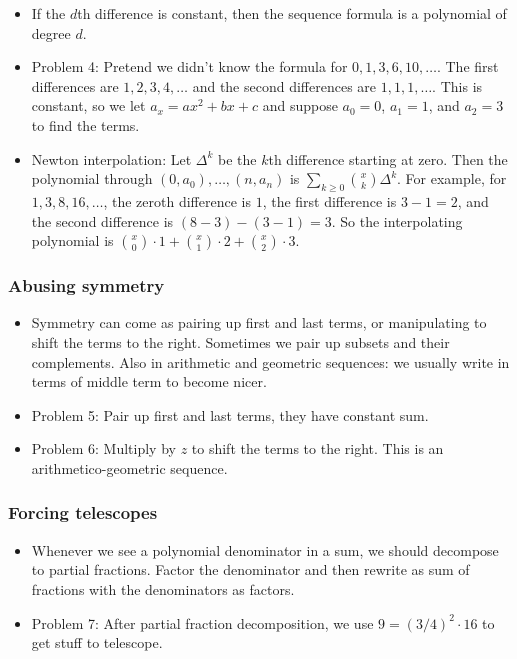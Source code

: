 \documentclass[10pt,paper=letter]{scrartcl}
\begin{document}
\begin{itemize}
  \item If the $d$th difference is constant, then the sequence formula is a polynomial of degree $d$.
  \item Problem 4: Pretend we didn't know the formula for $0, 1, 3, 6, 10, \ldots$. The first differences are $1, 2, 3, 4, \ldots$ and the second differences are $1, 1, 1, \ldots$. This is constant, so we let $a_x = ax^2 + bx + c$ and suppose $a_0 = 0$, $a_1 = 1$, and $a_2 = 3$ to find the terms.
  \item Newton interpolation: Let $\Delta^k$ be the $k$th difference starting at zero. Then the polynomial through $(0, a_0), \ldots, (n, a_n)$ is $\sum_{k \geq 0} \binom{x}{k}\Delta^k$. For example, for $1, 3, 8, 16, \ldots$, the zeroth difference is $1$, the first difference is $3 - 1 = 2$, and the second difference is $(8 - 3) - (3 - 1) = 3$. So the interpolating polynomial is $\binom{x}{0}\cdot 1 + \binom{x}{1} \cdot 2 + \binom{x}{2} \cdot 3$.
\end{itemize}

\subsubsection*{Abusing symmetry}

\begin{itemize}
  \item Symmetry can come as pairing up first and last terms, or manipulating to shift the terms to the right. Sometimes we pair up subsets and their complements. Also in arithmetic and geometric sequences: we usually write in terms of middle term to become nicer.
  \item Problem 5: Pair up first and last terms, they have constant sum.
  \item Problem 6: Multiply by $z$ to shift the terms to the right. This is an arithmetico-geometric sequence.
\end{itemize}

\subsubsection*{Forcing telescopes}

\begin{itemize}
  \item Whenever we see a polynomial denominator in a sum, we should decompose to partial fractions. Factor the denominator and then rewrite as sum of fractions with the denominators as factors.
  \item Problem 7: After partial fraction decomposition, we use $9 = (3/4)^2 \cdot 16$ to get stuff to telescope.
\end{itemize}
\end{document}
